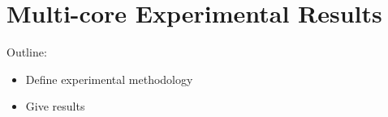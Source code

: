 \section{Multi-core Experimental Results}
\label{sec:experimental_results}


Outline:
\begin{itemize}
\item Define experimental methodology
\item Give results
\end{itemize}

